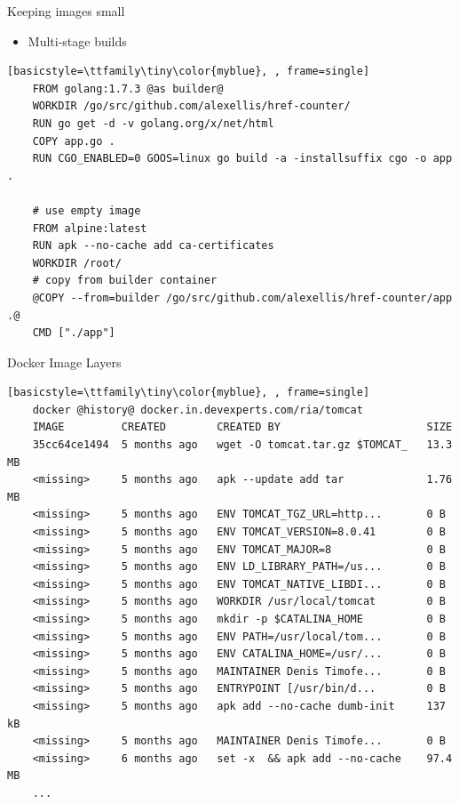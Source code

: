 \begin{frame}[fragile]{Keeping images small}  
  \begin{itemize}
    \item Multi-stage builds
  \end{itemize}  
  \begin{lstlisting}[basicstyle=\ttfamily\tiny\color{myblue}, , frame=single]
    FROM golang:1.7.3 @as builder@
    WORKDIR /go/src/github.com/alexellis/href-counter/
    RUN go get -d -v golang.org/x/net/html  
    COPY app.go .
    RUN CGO_ENABLED=0 GOOS=linux go build -a -installsuffix cgo -o app .

    # use empty image
    FROM alpine:latest  
    RUN apk --no-cache add ca-certificates
    WORKDIR /root/
    # copy from builder container
    @COPY --from=builder /go/src/github.com/alexellis/href-counter/app .@
    CMD ["./app"]
  \end{lstlisting}  
\end{frame}

\begin{frame}[fragile]{Docker Image Layers }  
  \begin{lstlisting}[basicstyle=\ttfamily\tiny\color{myblue}, , frame=single]
    docker @history@ docker.in.devexperts.com/ria/tomcat
    IMAGE         CREATED        CREATED BY                       SIZE
    35cc64ce1494  5 months ago   wget -O tomcat.tar.gz $TOMCAT_   13.3 MB
    <missing>     5 months ago   apk --update add tar             1.76 MB
    <missing>     5 months ago   ENV TOMCAT_TGZ_URL=http...       0 B
    <missing>     5 months ago   ENV TOMCAT_VERSION=8.0.41        0 B
    <missing>     5 months ago   ENV TOMCAT_MAJOR=8               0 B
    <missing>     5 months ago   ENV LD_LIBRARY_PATH=/us...       0 B
    <missing>     5 months ago   ENV TOMCAT_NATIVE_LIBDI...       0 B
    <missing>     5 months ago   WORKDIR /usr/local/tomcat        0 B
    <missing>     5 months ago   mkdir -p $CATALINA_HOME          0 B
    <missing>     5 months ago   ENV PATH=/usr/local/tom...       0 B
    <missing>     5 months ago   ENV CATALINA_HOME=/usr/...       0 B
    <missing>     5 months ago   MAINTAINER Denis Timofe...       0 B
    <missing>     5 months ago   ENTRYPOINT [/usr/bin/d...        0 B
    <missing>     5 months ago   apk add --no-cache dumb-init     137 kB
    <missing>     5 months ago   MAINTAINER Denis Timofe...       0 B
    <missing>     6 months ago   set -x  && apk add --no-cache    97.4 MB
    ...
  \end{lstlisting}  
\end{frame}

